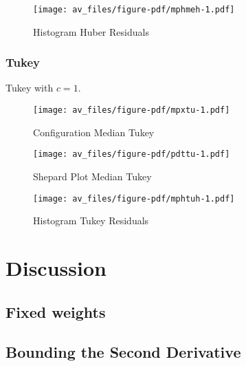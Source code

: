 \documentclass[
  12pt,
  letterpaper,
  DIV=11,
  numbers=noendperiod]{scrartcl}
\newcommand{\sectionbreak}{\pagebreak}
\theoremstyle{plain}
\theoremstyle{remark}
\begin{document}
\begin{figure}[H]

{\centering \texttt{[image: av\_files/figure-pdf/mphmeh-1.pdf]}

}

\caption{Histogram Huber Residuals}

\end{figure}%

\subsubsection{Tukey}\label{tukey-2}

Tukey with \(c=1\).

\begin{figure}[H]

{\centering \texttt{[image: av\_files/figure-pdf/mpxtu-1.pdf]}

}

\caption{Configuration Median Tukey}

\end{figure}%

\begin{figure}[H]

{\centering \texttt{[image: av\_files/figure-pdf/pdttu-1.pdf]}

}

\caption{Shepard Plot Median Tukey}

\end{figure}%

\begin{figure}[H]

{\centering \texttt{[image: av\_files/figure-pdf/mphtuh-1.pdf]}

}

\caption{Histogram Tukey Residuals}

\end{figure}%

\sectionbreak

\section{Discussion}\label{discussion}

\subsection{Fixed weights}\label{fixed-weights}

\subsection{Bounding the Second
Derivative}\label{bounding-the-second-derivative}
\end{document}
